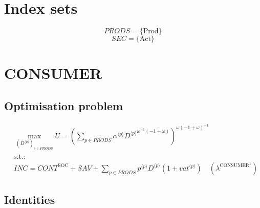 

\section*{Index sets}

$${P\!R\!O\!D\!S} = \{ \mathrm{Prod} \}$$
$${S\!E\!C} = \{ \mathrm{Act} \}$$

\section{CONSUMER}

\subsection{Optimisation problem}

\begin{align}
&\max_{\left({D}^{\langle p\rangle}\right)_{p\in {P\!R\!O\!D\!S}}
} U = \left(\sum_{p\in {P\!R\!O\!D\!S}} {{\alpha}^{\langle p\rangle}} {{{D}^{\langle p\rangle}}^{{\omega}^{-1} \left(-1 + \omega\right)}}\right)^{{\omega} \left(-1 + \omega\right)^{-1}}\\
&\mathrm{s.t.:}\nonumber\\
& {I\!N\!C} = {C\!O\!N\!T}^{\mathrm{SOC}} + {S\!A\!V} + \sum_{p\in {P\!R\!O\!D\!S}} {{p}^{\langle p\rangle}} {{D}^{\langle p\rangle}} \left(1 + {{v\!a\!t}}^{\langle p\rangle}\right) \quad \left(\lambda^{\mathrm{CONSUMER}^{\mathrm{1}}}\right)
\end{align}


\subsection{Identities}

